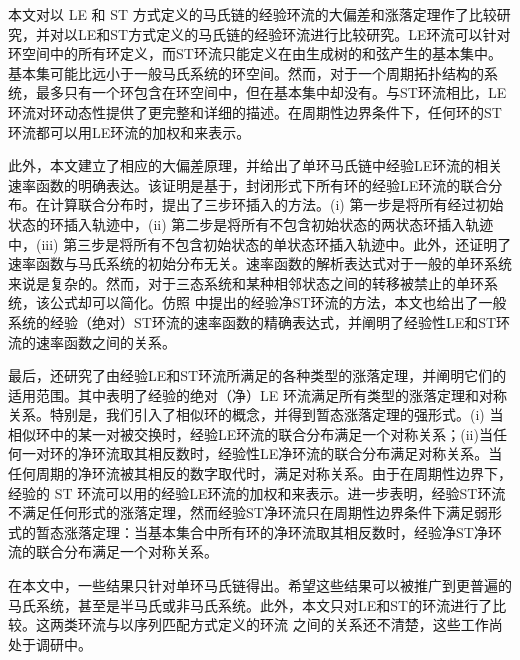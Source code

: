 本文对以 LE 和 ST 方式定义的马氏链的经验环流的大偏差和涨落定理作了比较研究，并对以LE和ST方式定义的马氏链的经验环流进行比较研究。LE环流可以针对环空间中的所有环定义，而ST环流只能定义在由生成树的和弦产生的基本集中。基本集可能比远小于一般马氏系统的环空间。然而，对于一个周期拓扑结构的系统，最多只有一个环包含在环空间中，但在基本集中却没有。与ST环流相比，LE环流对环动态性提供了更完整和详细的描述。在周期性边界条件下，任何环的ST环流都可以用LE环流的加权和来表示。

此外，本文建立了相应的大偏差原理，并给出了单环马氏链中经验LE环流的相关速率函数的明确表达。该证明是基于，封闭形式下所有环的经验LE环流的联合分布。在计算联合分布时，提出了三步环插入的方法。(i) 第一步是将所有经过初始状态的环插入轨迹中，(ii) 第二步是将所有不包含初始状态的两状态环插入轨迹中，(iii) 第三步是将所有不包含初始状态的单状态环插入轨迹中。此外，还证明了速率函数与马氏系统的初始分布无关。速率函数的解析表达式对于一般的单环系统来说是复杂的。然而，对于三态系统和某种相邻状态之间的转移被禁止的单环系统，该公式却可以简化。仿照 \cite{bertini2015flows} 中提出的经验净ST环流的方法，本文也给出了一般系统的经验（绝对）ST环流的速率函数的精确表达式，并阐明了经验性LE和ST环流的速率函数之间的关系。

最后，还研究了由经验LE和ST环流所满足的各种类型的涨落定理，并阐明它们的适用范围。其中表明了经验的绝对（净）LE 环流满足所有类型的涨落定理和对称关系。特别是，我们引入了相似环的概念，并得到暂态涨落定理的强形式。(i) 当相似环中的某一对被交换时，经验LE环流的联合分布满足一个对称关系；(ii)当任何一对环的净环流取其相反数时，经验性LE净环流的联合分布满足对称关系。当任何周期的净环流被其相反的数字取代时，满足对称关系。由于在周期性边界下，经验的 ST 环流可以用的经验LE环流的加权和来表示。进一步表明，经验ST环流不满足任何形式的涨落定理，然而经验ST净环流只在周期性边界条件下满足弱形式的暂态涨落定理：当基本集合中所有环的净环流取其相反数时，经验净ST净环流的联合分布满足一个对称关系。

在本文中，一些结果只针对单环马氏链得出。希望这些结果可以被推广到更普遍的马氏系统，甚至是半马氏或非马氏系统。此外，本文只对LE和ST的环流进行了比较。这两类环流与以序列匹配方式定义的环流 \cite{roldan2019exact,biddle2020reversal,pietzonka2021cycle} 之间的关系还不清楚，这些工作尚处于调研中。